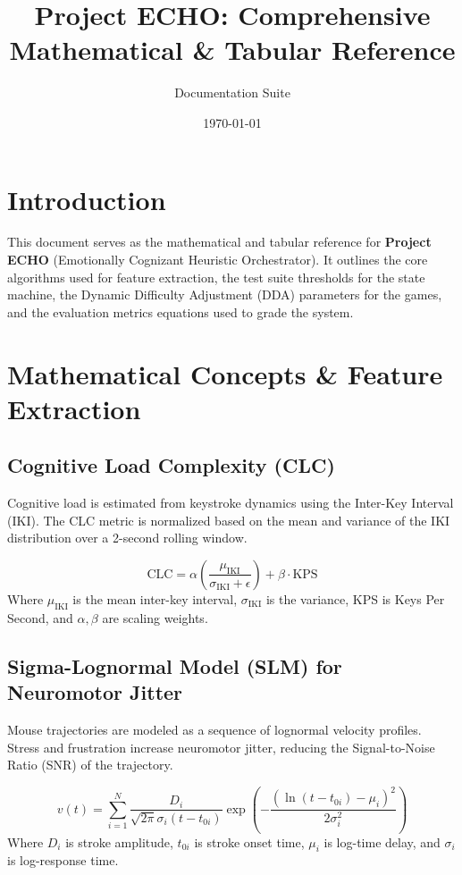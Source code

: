 \documentclass[11pt,a4paper]{article}
\title{\textbf{Project ECHO: Comprehensive Mathematical \& Tabular Reference}}
\author{Documentation Suite}
\date{\today}
\begin{document}
\maketitle

\section{Introduction}
This document serves as the mathematical and tabular reference for \textbf{Project ECHO} (Emotionally Cognizant Heuristic Orchestrator). It outlines the core algorithms used for feature extraction, the test suite thresholds for the state machine, the Dynamic Difficulty Adjustment (DDA) parameters for the games, and the evaluation metrics equations used to grade the system.

\section{Mathematical Concepts \& Feature Extraction}

\subsection{Cognitive Load Complexity (CLC)}
Cognitive load is estimated from keystroke dynamics using the Inter-Key Interval (IKI). The CLC metric is normalized based on the mean and variance of the IKI distribution over a 2-second rolling window.

\begin{equation}
    \text{CLC} = \alpha \left(\frac{\mu_{\text{IKI}}}{\sigma_{\text{IKI}} + \epsilon}\right) + \beta \cdot \text{KPS}
\end{equation}
Where $\mu_{\text{IKI}}$ is the mean inter-key interval, $\sigma_{\text{IKI}}$ is the variance, KPS is Keys Per Second, and $\alpha, \beta$ are scaling weights.

\subsection{Sigma-Lognormal Model (SLM) for Neuromotor Jitter}
Mouse trajectories are modeled as a sequence of lognormal velocity profiles. Stress and frustration increase neuromotor jitter, reducing the Signal-to-Noise Ratio (SNR) of the trajectory.

\begin{equation}
    v(t) = \sum_{i=1}^{N} \frac{D_i}{\sqrt{2\pi} \sigma_i (t - t_{0i})} \exp \left( - \frac{(\ln(t - t_{0i}) - \mu_i)^2}{2\sigma_i^2} \right)
\end{equation}
Where $D_i$ is stroke amplitude, $t_{0i}$ is stroke onset time, $\mu_i$ is log-time delay, and $\sigma_i$ is log-response time.
\end{document}
